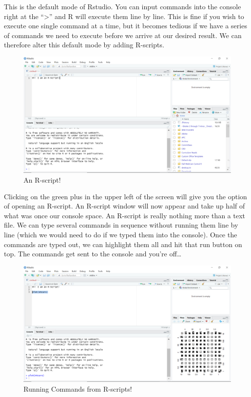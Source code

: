 \documentclass[
]{book}
\begin{document}
This is the default mode of Rstudio. You can input commands into the console right at the ``\textgreater{}'' and R will execute them line by line. This is fine if you wish to execute one single command at a time, but it becomes tedious if we have a series of commands we need to execute before we arrive at our desired result. We can therefore alter this default mode by adding R-scripts.

\begin{figure}

{\centering \includegraphics[width=0.75\linewidth]{images/Screenshot2} 

}

\caption{An R-script!}\label{fig:unnamed-chunk-30}
\end{figure}

Clicking on the green plus in the upper left of the screen will give you the option of opening an R-script. An R-script window will now appear and take up half of what was once our console space. An R-script is really nothing more than a text file. We can type several commands in sequence without running them line by line (which we would need to do if we typed them into the console). Once the commands are typed out, we can highlight them all and hit that run button on top. The commands get sent to the console and you're off\ldots{}

\begin{figure}

{\centering \includegraphics[width=0.75\linewidth]{images/Screenshot3} 

}

\caption{Running Commands from R-scripts!}\label{fig:unnamed-chunk-31}
\end{figure}
\end{document}
